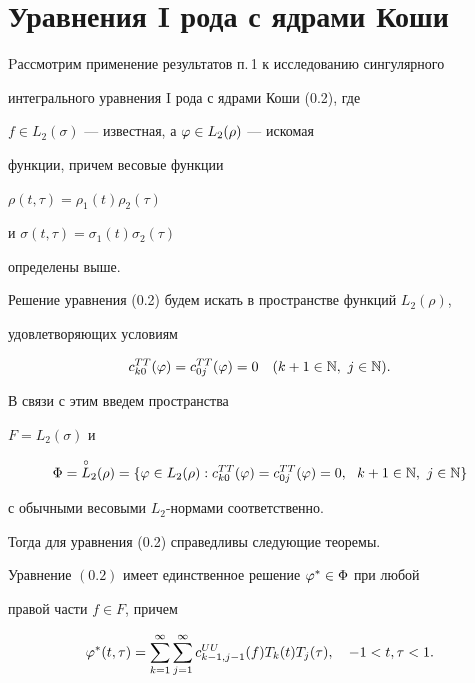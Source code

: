 \section{Уравнения I рода с ядрами Коши}








Pассмотрим применение результатов п.\,1 к исследованию сингулярного 


интегрального уравнения I рода с ядрами Коши (0.2), где


$f\in L_2(\sigma)$ --- известная, а $\varphi\in L_2(\rho)$ --- искомая 


функции, причем весовые функции 


$\rho(t,\tau) = \rho_1(t)\rho_2(\tau)$


и $\sigma(t,\tau) = \sigma_1(t)\sigma_2(\tau)$


определены выше.





Решение уравнения (0.2) будем искать в пространстве функций $L_2(\rho)$, 


удовлетворяющих условиям


\begin{equation}


c_{k0}^{TT}(\vp) = c_{0j}^{TT}(\vp) = 0\quad (k+1\in\N,\ j\in\N).


\end{equation}


В связи с этим введем пространства


$F = L_2(\sigma)$ и 


$$


\Phi = \cL(\rho) = \{\vp \in L_2(\rho):c_{k0}^{TT}(\vp) =


c_{0j}^{TT}(\vp) = 0,\ \ k+1\in\N, \ j\in\N\}


$$


с обычными весовыми $L_2$-нормами соответственно.


Тогда для уравнения (0.2) справедливы следующие теоремы.





\begin{thms}


Уравнение $(0.2)$ имеет единственное решение $\varphi^*\in \Phi$ при любой 


правой части $f\in F$, причем


\begin{equation}


\vp^*(t,\tau) = \suml_{k=1}^\infty\suml_{j=1}^\infty c_{k-1,j-1}^{UU}(f)


T_k(t)T_j(\tau),\quad -1< t,\tau <1.


\end{equation}


\end{thms}





